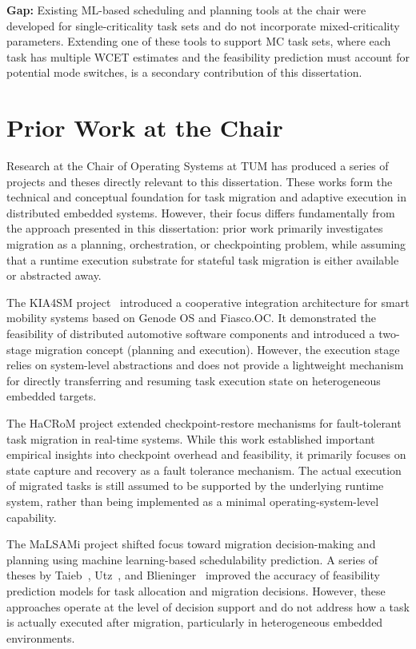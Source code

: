 \textbf{Gap:} Existing ML-based scheduling and planning tools at the chair were
developed for single-criticality task sets and do not incorporate mixed-criticality
parameters. Extending one of these tools to support MC task sets, where each task has
multiple WCET estimates and the feasibility prediction must account for potential
mode switches, is a secondary contribution of this dissertation.

\section{Prior Work at the Chair}
\label{sec:rw_chair}

Research at the Chair of Operating Systems at TUM has produced a series of projects
and theses directly relevant to this dissertation. These works form the technical
and conceptual foundation for task migration and adaptive execution in distributed
embedded systems. However, their focus differs fundamentally from the approach
presented in this dissertation: prior work primarily investigates migration as a
planning, orchestration, or checkpointing problem, while assuming that a runtime
execution substrate for stateful task migration is either available or abstracted
away.

The KIA4SM project~\cite{eckl2015} introduced a cooperative integration architecture
for smart mobility systems based on Genode OS and Fiasco.OC. It demonstrated the
feasibility of distributed automotive software components and introduced a
two-stage migration concept (planning and execution). However, the execution stage
relies on system-level abstractions and does not provide a lightweight mechanism
for directly transferring and resuming task execution state on heterogeneous
embedded targets.

The HaCRoM project extended checkpoint-restore mechanisms for fault-tolerant task
migration in real-time systems. While this work established important empirical
insights into checkpoint overhead and feasibility, it primarily focuses on state
capture and recovery as a fault tolerance mechanism. The actual execution of
migrated tasks is still assumed to be supported by the underlying runtime system,
rather than being implemented as a minimal operating-system-level capability.

The MaLSAMi project shifted focus toward migration decision-making and planning
using machine learning-based schedulability prediction. A series of theses by
Taieb~\cite{taieb1}, Utz~\cite{utz1}, and Blieninger~\cite{blieninger1} improved
the accuracy of feasibility prediction models for task allocation and migration
decisions. However, these approaches operate at the level of decision support and
do not address how a task is actually executed after migration, particularly in
heterogeneous embedded environments.

